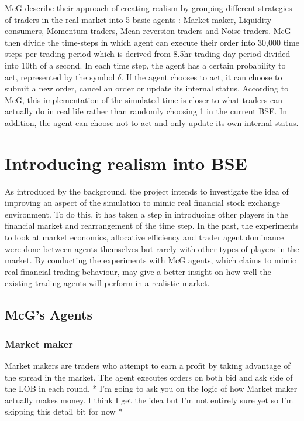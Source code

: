 \documentclass{article}
\begin{document}
McG describe their approach of creating realism by grouping different strategies of traders in the real market into 5 basic agents : Market maker, Liquidity consumers, Momentum traders, Mean reversion traders and Noise traders. McG then divide the time-steps in which agent can execute their order into 30,000 time steps per trading period which is derived from 8.5hr trading day period divided into 10th of a second. In each time step, the agent has a certain probability to act, represented by the symbol $\delta$. If the agent chooses to act, it can choose to submit a new order, cancel an order or update its internal status. According to McG, this implementation of the simulated time is closer to what traders can actually do in real life rather than randomly choosing 1 in the current BSE. In addition, the agent can choose not to act and only update its own internal status.



\section{Introducing realism into BSE}
As introduced by the background, the project intends to investigate the idea of improving an aspect of the simulation to mimic real financial stock exchange environment. To do this, it has taken a step in introducing other players in the financial market and rearrangement of the time step. In the past, the experiments to look at market economics, allocative efficiency and trader agent dominance were done between agents themselves but rarely with other types of players in the market. By conducting the experiments with McG agents, which claims to mimic real financial trading behaviour, may give a better insight on how well the existing trading agents will perform in a realistic market. 

\subsection{McG's Agents}

\subsubsection{Market maker}
Market makers are traders who attempt to earn a profit by taking advantage of the spread in the market. The agent executes orders on both bid and ask side of the LOB in each round. * I'm going to ask you on the logic of how Market maker actually makes money. I think I get the idea but I'm not entirely sure yet so I'm skipping this detail bit for now * 
\end{document}
